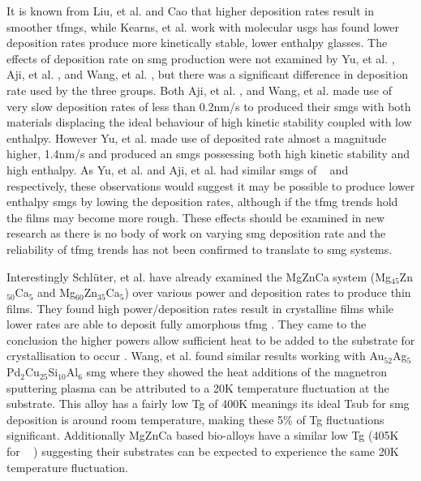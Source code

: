 \documentclass[a4paper,12pt,oneside]{report}%
\begin{document}
It is known from Liu, et al. \cite{Liu2012} and Cao \cite{Cao2013} that higher deposition rates result in smoother \glspl{tfmg}, while Kearns, et al. \cite{Kearns2008} work with molecular \glspl{usg} has found lower deposition rates produce more kinetically stable, lower enthalpy glasses. The effects of deposition rate on \gls{smg} production were not examined by Yu, et al. \cite{Yu2013}, Aji, et al. \cite{Aji2013}, and Wang, et al. \cite{Wang2014}, but there was a significant difference in deposition rate used by the three groups. Both Aji, et al. \cite{Aji2013}, and Wang, et al. \cite{Wang2014} made use of very slow deposition rates of less than 0.2nm/s to produced their \glspl{smg} with both materials displacing the ideal behaviour of high kinetic stability coupled with low enthalpy. However Yu, et al. \cite{Yu2013} made use of deposited rate almost a magnitude higher, 1.4nm/s and produced an \glspl{smg} possessing both high kinetic stability and high enthalpy. As Yu, et al. \cite{Yu2013} and Aji, et al. \cite{Aji2013} had similar \glspl{smg} of \ZrCuAl~ and \ZrCuNiAl~ respectively, these observations would suggest it may be possible to produce lower enthalpy \glspl{smg} by lowing the deposition rates, although if the \gls{tfmg} trends hold the films may become more rough. These effects should be examined in new research as there is no body of work on varying \gls{smg} deposition rate and the reliability of \gls{tfmg} trends has not been confirmed to translate to \gls{smg} systems. 

Interestingly Schlüter, et al. \cite{Schluter2012} have already examined the MgZnCa system (Mg$_{45}$Zn$_{50}$Ca$_{5}$ and Mg$_{60}$Zn$_{35}$Ca$_{5}$) over various power and deposition rates to produce thin films. They found high power/deposition rates result in crystalline films while lower rates are able to deposit fully amorphous  \gls{tfmg} \cite{Schluter2012}. They came to the conclusion the higher powers allow sufficient heat to be added to the substrate for crystallisation to occur \cite{Schluter2012}. Wang, et al. \cite{Wang2014} found similar results working with Au$_{52}$Ag$_{5}$Pd$_{2}$Cu$_{25}$Si$_{10}$Al$_{6}$ \gls{smg} where they showed the heat additions of the magnetron sputtering plasma can be attributed to a 20K temperature fluctuation at the substrate. This alloy has a fairly low \gls{Tg} of 400K meanings its ideal \gls{Tsub} for \gls{smg} deposition is around room temperature, making these 5\% of \gls{Tg} fluctuations significant. Additionally MgZnCa based bio-alloys have a similar low \gls{Tg} (405K for \MgZnCa~ \cite{Cao2013b, Gu2005}) suggesting their substrates can be expected to experience the same 20K temperature fluctuation. 
\end{document}
